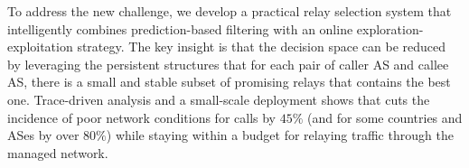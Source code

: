 To address the new challenge, we develop a practical relay selection system
that intelligently combines prediction-based filtering with an online 
exploration-exploitation strategy. 
The key insight is that the decision space
can be reduced by leveraging the persistent structures that 
for each pair of caller AS and callee AS, there is a small 
and stable subset of promising relays that contains the best one.
Trace-driven analysis and a small-scale deployment 
shows that \hybrid cuts the incidence of poor network 
conditions for calls by $45\%$ (and for some countries 
and ASes by over $80\%$) while staying within a budget
for relaying traffic through the managed network.


%
%


